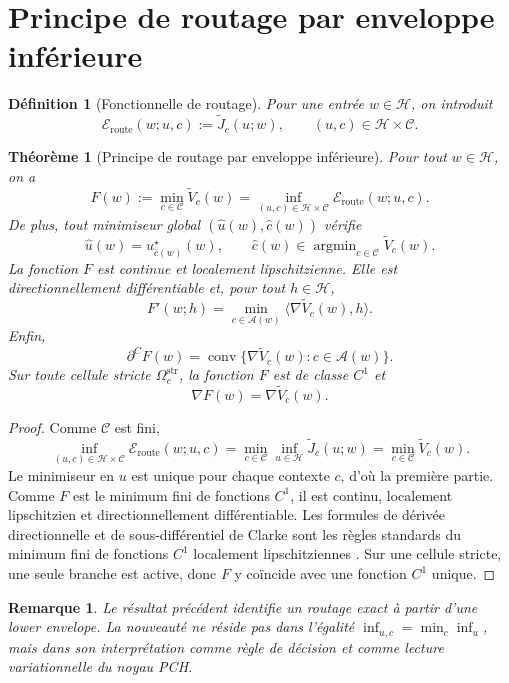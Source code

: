 \documentclass[11pt,a4paper]{article}
\newtheorem{definition}{Définition}[section]
\newtheorem{theorem}{Théorème}[section]
\newtheorem{remark}{Remarque}[section]
\DeclareMathOperator{\argmin}{argmin}
\DeclareMathOperator{\conv}{conv}
\newcommand{\Hh}{\mathcal H}
\newcommand{\Ccal}{\mathcal C}
\newcommand{\Acal}{\mathcal A}
\begin{document}
\section{Principe de routage par enveloppe inférieure}

\begin{definition}[Fonctionnelle de routage]
Pour une entrée \(w\in\Hh\), on introduit
\[
\mathcal E_{\mathrm{route}}(w;u,c):=\widetilde J_c(u;w),
\qquad (u,c)\in\Hh\times\Ccal.
\]
\end{definition}

\begin{theorem}[Principe de routage par enveloppe inférieure]
Pour tout \(w\in\Hh\), on a
\[
F(w):=\min_{c\in\Ccal}\widetilde V_c(w)
=
\inf_{(u,c)\in\Hh\times\Ccal}\mathcal E_{\mathrm{route}}(w;u,c).
\]
De plus, tout minimiseur global \((\hat u(w),\hat c(w))\) vérifie
\[
\hat u(w)=u_{\hat c(w)}^\star(w),
\qquad
\hat c(w)\in\argmin_{c\in\Ccal}\widetilde V_c(w).
\]
La fonction \(F\) est continue et localement lipschitzienne. Elle est directionnellement différentiable et, pour tout \(h\in\Hh\),
\[
F'(w;h)=\min_{c\in\Acal(w)}\langle \nabla \widetilde V_c(w),h\rangle.
\]
Enfin,
\[
\partial^C F(w)=\conv\{\nabla \widetilde V_c(w): c\in\Acal(w)\}.
\]
Sur toute cellule stricte \(\Omega_c^{\mathrm{str}}\), la fonction \(F\) est de classe \(C^1\) et
\[
\nabla F(w)=\nabla \widetilde V_c(w).
\]
\end{theorem}

\begin{proof}
Comme \(\Ccal\) est fini,
\[
\inf_{(u,c)\in\Hh\times\Ccal}\mathcal E_{\mathrm{route}}(w;u,c)
=
\min_{c\in\Ccal}\inf_{u\in\Hh}\widetilde J_c(u;w)
=
\min_{c\in\Ccal}\widetilde V_c(w).
\]
Le minimiseur en \(u\) est unique pour chaque contexte \(c\), d'où la première partie. Comme \(F\) est le minimum fini de fonctions \(C^1\), il est continu, localement lipschitzien et directionnellement différentiable. Les formules de dérivée directionnelle et de sous-différentiel de Clarke sont les règles standards du minimum fini de fonctions \(C^1\) localement lipschitziennes \cite{Clarke1983}. Sur une cellule stricte, une seule branche est active, donc \(F\) y coïncide avec une fonction \(C^1\) unique.
\end{proof}

\begin{remark}
Le résultat précédent identifie un routage exact à partir d'une lower envelope. La nouveauté ne réside pas dans l'égalité \(\inf_{u,c}=\min_c\inf_u\), mais dans son interprétation comme règle de décision et comme lecture variationnelle du noyau PCH.
\end{remark}
\end{document}

